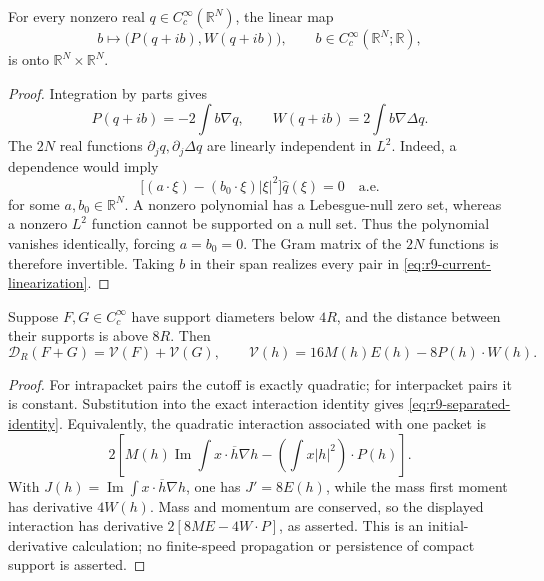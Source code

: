 \begin{lemma}
\label{lem:r9-independent-currents}
For every nonzero real $q\in C_c^\infty(\mathbb R^N)$, the linear
map
\[
 b\longmapsto \bigl(P(q+ib),W(q+ib)\bigr),
 \qquad b\in C_c^\infty(\mathbb R^N;\mathbb R),
\]
is onto $\mathbb R^N\times\mathbb R^N$.
\end{lemma}
\begin{proof}
Integration by parts gives
\begin{equation}\label{eq:r9-current-linearization}
 P(q+ib)=-2\int b\nabla q,\qquad
 W(q+ib)=2\int b\nabla\Delta q.
\end{equation}
The $2N$ real functions $\partial_jq,\partial_j\Delta q$ are
linearly independent in $L^2$. Indeed, a dependence would imply
\[
 \bigl[(a\cdot\xi)-(b_0\cdot\xi)|\xi|^2\bigr]\widehat q(\xi)=0
 \quad\text{a.e.}
\]
for some $a,b_0\in\mathbb R^N$. A nonzero polynomial has a
Lebesgue-null zero set, whereas a nonzero $L^2$ function cannot
be supported on a null set. Thus the polynomial vanishes
identically, forcing $a=b_0=0$. The Gram matrix of the $2N$
functions is therefore invertible. Taking $b$ in their span
realizes every pair in \eqref{eq:r9-current-linearization}.
\end{proof}

\begin{lemma}
\label{lem:r9-separated-virial}
Suppose $F,G\in C_c^\infty$ have support diameters below $4R$, and
the distance between their supports is above $8R$. Then
\begin{equation}\label{eq:r9-separated-identity}
 \mathcal D_R(F+G)=\mathcal V(F)+\mathcal V(G),\qquad
 \mathcal V(h)=16M(h)E(h)-8P(h)\cdot W(h).
\end{equation}
\end{lemma}
\begin{proof}
For intrapacket pairs the cutoff is exactly quadratic; for
interpacket pairs it is constant. Substitution into the exact
interaction identity gives \eqref{eq:r9-separated-identity}.
Equivalently, the quadratic interaction associated with one
packet is
\[
 2\left[M(h)\operatorname{Im}\int x\cdot\overline h\nabla h
       -\left(\int x|h|^2\right)\cdot P(h)\right].
\]
With $J(h)=\operatorname{Im}\int x\cdot\overline h\nabla h$,
one has $J'=8E(h)$, while the mass first moment has derivative
$4W(h)$. Mass and momentum are conserved, so the displayed
interaction has derivative $2[8ME-4W\cdot P]$, as asserted. This is an
initial-derivative calculation; no finite-speed propagation or
persistence of compact support is asserted.
\end{proof}

